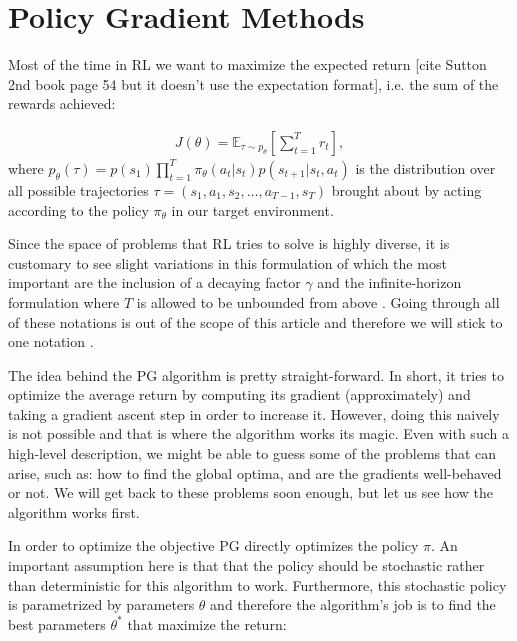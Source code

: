 \section{Policy Gradient Methods}
\label{sec:background_pg}

Most of the time in \ac{RL} we want to maximize the expected return [cite Sutton 2nd book page 54 but it doesn't use the expectation format], i.e. the sum of the rewards achieved:

\begin{align}
    J(\theta) = \mathbb{E}_{\tau \sim p_\theta}\left[ \sum_{t=1}^{T} r_t \right],
\end{align}
where $p_\theta(\tau) = p(s_1)\prod_{t=1}^T \pi_\theta(a_t|s_t) p(s_{t+1}|s_t,a_t)$ is the distribution over all possible trajectories $\tau = (s_1, a_1, s_2, \dots, a_{T-1}, s_T)$ brought about by acting according to the policy $\pi_\theta$ in our target environment.

Since the space of problems that \ac{RL} tries to solve is highly diverse, it is customary to see slight variations in this formulation of which the most important are the inclusion of a decaying factor $\gamma$ and the infinite-horizon formulation where $T$ is allowed to be unbounded from above . Going through all of these notations is out of the scope of this article and therefore we will stick to one notation  .



The idea behind the \ac{PG} algorithm is pretty straight-forward. In short, it tries to optimize the average return by computing its gradient (approximately) and taking a gradient ascent step in order to increase it. However, doing this naively is not possible and that is where the algorithm works its magic. Even with such a high-level description, we might be able to guess some of the problems that can arise, such as: how to find the global optima, and are the gradients well-behaved or not. We will get back to these problems soon enough, but let us see how the algorithm works first.

In order to optimize the objective \ac{PG} directly optimizes the policy $\pi$. An important assumption here is that that the policy should be stochastic rather than deterministic for this algorithm to work. Furthermore, this stochastic policy is parametrized by parameters $\theta$ and therefore the algorithm's job is to find the best parameters $\theta^*$ that maximize the return: 


